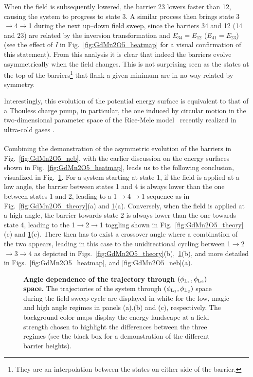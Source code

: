 When the field is subsequently lowered, the barrier 23 lowers faster than 12, causing the system to progress to state 3.
A similar process then brings state 3$\rightarrow$4$\rightarrow$1 during the next up--down field sweep, since the barriers 34 and 12  (14 and 23) are related by the inversion transformation and  $E_{34} = E_{12}$ ($E_{41} = E_{23}$) (see the effect of {\it I} in Fig.~\ref{fig:GdMn2O5_heatmap} for a visual confirmation of this statement).
From this analysis it is clear that indeed the barriers evolve asymmetrically when the field changes.
This is not surprising seen as the states at the top of the barriers\footnote{They are an interpolation between the states on either side of the barrier.} that flank a given minimum are in no way related by symmetry.

Interestingly, this evolution of the potential energy surface is equivalent to that of a Thouless charge pump, in particular, the one induced by circular motion in the two-dimensional parameter space of the Rice-Mele model~\cite{Rice82} recently realized in ultra-cold gases \cite{Lohse16,Nakajima16,Atala13}.
\\\\
Combining the demonstration of the asymmetric evolution of the barriers in Fig.~\ref{fig:GdMn2O5_neb}, with the earlier discussion on the energy surfaces shown in Fig.~\ref{fig:GdMn2O5_heatmap}, leads us to the following conclusion, visualized in Fig.~\ref{fig:GdMn2O5_trajectories}.
For a system starting at state 1, if the field is applied at a low angle, the barrier between states 1 and 4 is always lower than the one between states 1 and 2, leading to a 1$\rightarrow$4$\rightarrow$1 sequence as in Fig.~\ref{fig:GdMn2O5_theory}(a) and \ref{fig:GdMn2O5_trajectories}(a).
Conversely, when the field is applied at a high angle, the barrier towards state 2 is always lower than the one towards state 4, leading to the 1$\rightarrow$2$\rightarrow$1 toggling shown in Fig.~\ref{fig:GdMn2O5_theory}(c) and \ref{fig:GdMn2O5_trajectories}(c).
There then has to exist a crossover angle where a combination of the two appears, leading in this case to the unidirectional cycling between 1$\rightarrow$2$\rightarrow$3$\rightarrow$4 as depicted in Figs.~\ref{fig:GdMn2O5_theory}(b),~\ref{fig:GdMn2O5_trajectories}(b), and more detailed in Figs.~\ref{fig:GdMn2O5_heatmap}, and \ref{fig:GdMn2O5_neb}(a).
\begin{figure}
    \caption{\label{fig:GdMn2O5_trajectories}{\bf Angle dependence of the trajectory through $(\phi_{\rm L_1},\phi_{\rm L_2})$ space.}
    The trajectories of the system through $(\phi_{\rm L_1},\phi_{\rm L_2})$ space during the field sweep cycle are displayed in white for the low, magic and high angle regimes in panels (a),(b) and (c), respectively. The background color maps display the energy landscape at a field strength chosen to highlight the differences between the three regimes (see the black box for a demonstration of the different barrier heights). 
}
\end{figure}
